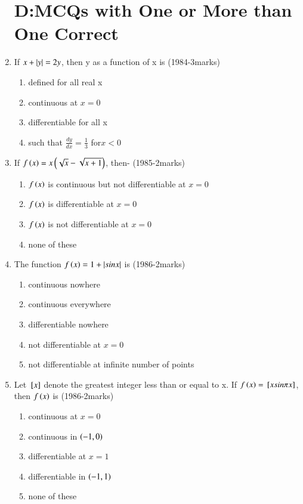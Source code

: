 \documentclass[journal]{IEEEtran}
\numberwithin{equation}{enumi}
\numberwithin{figure}{enumi}
\begin{document}
\begin{enumerate}
\section{D:MCQs with One or More than One Correct}
	\item If $x+\left\vert y\right\vert=2y$, then y as a function of x is \hfill{(1984-3marks)}
		\begin{enumerate}
			\item defined for all real x
			\item continuous at $x=0$
			\item differentiable for all x
			\item such that $\frac{dy}{dx}=\frac{1}{3}$ for$x<0$ 
		\end{enumerate}
	\item If $f\left(x\right)=x\left(\sqrt{x}-\sqrt{x+1}\right)$, then- \hfill{(1985-2marks)}
		\begin{enumerate}
			\item $f\left(x\right)$ is continuous but not differentiable at $x=0$
			\item $f\left(x\right)$ is differentiable at $x=0$
			\item $f\left(x\right)$ is not differentiable at $x=0$
			\item none of these 
		\end{enumerate}
	\item The function $f\left(x\right)=1+\left\vert sinx\right\vert$ is \hfill{(1986-2marks)}
		\begin{enumerate}
			\item continuous nowhere
			\item continuous everywhere
			\item differentiable nowhere 
			\item not differentiable at $x=0$
			\item not differentiable at infinite number of points 
		\end{enumerate}
	\item Let ${}\left[x\right]$ denote the greatest integer less than or equal to x. If $f\left(x\right)={}\left[xsin \pi x\right]$, then $f\left(x\right)$ is \hfill{(1986-2marks)}
		\begin{enumerate}
			\item continuous at $x=0$
			\item continuous in $\left(-1,0\right)$
			\item differentiable at $x=1$ 
			\item differentiable in $\left(-1,1\right)$ 
			\item none of these 
		\end{enumerate}

\end{enumerate}
\end{document}
